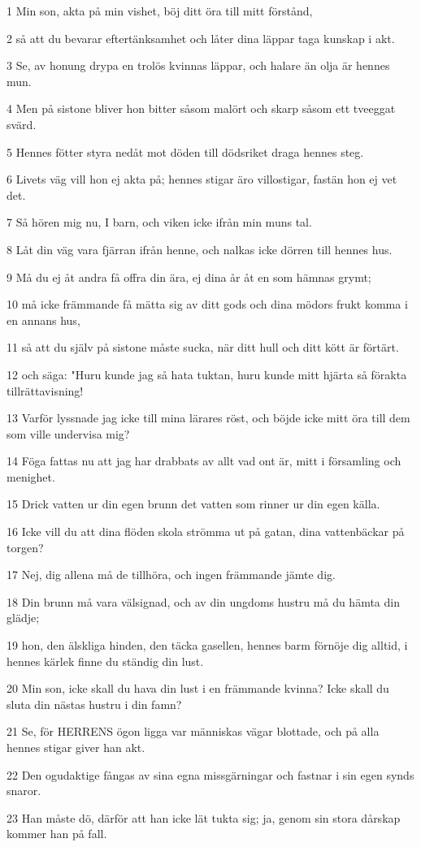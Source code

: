 \par 1 Min son, akta på min vishet, böj ditt öra till mitt förstånd,
\par 2 så att du bevarar eftertänksamhet och låter dina läppar taga kunskap i akt.
\par 3 Se, av honung drypa en trolös kvinnas läppar, och halare än olja är hennes mun.
\par 4 Men på sistone bliver hon bitter såsom malört och skarp såsom ett tveeggat svärd.
\par 5 Hennes fötter styra nedåt mot döden till dödsriket draga hennes steg.
\par 6 Livets väg vill hon ej akta på; hennes stigar äro villostigar, fastän hon ej vet det.
\par 7 Så hören mig nu, I barn, och viken icke ifrån min muns tal.
\par 8 Låt din väg vara fjärran ifrån henne, och nalkas icke dörren till hennes hus.
\par 9 Må du ej åt andra få offra din ära, ej dina år åt en som hämnas grymt;
\par 10 må icke främmande få mätta sig av ditt gods och dina mödors frukt komma i en annans hus,
\par 11 så att du själv på sistone måste sucka, när ditt hull och ditt kött är förtärt.
\par 12 och säga: "Huru kunde jag så hata tuktan, huru kunde mitt hjärta så förakta tillrättavisning!
\par 13 Varför lyssnade jag icke till mina lärares röst, och böjde icke mitt öra till dem som ville undervisa mig?
\par 14 Föga fattas nu att jag har drabbats av allt vad ont är, mitt i församling och menighet.
\par 15 Drick vatten ur din egen brunn det vatten som rinner ur din egen källa.
\par 16 Icke vill du att dina flöden skola strömma ut på gatan, dina vattenbäckar på torgen?
\par 17 Nej, dig allena må de tillhöra, och ingen främmande jämte dig.
\par 18 Din brunn må vara välsignad, och av din ungdoms hustru må du hämta din glädje;
\par 19 hon, den älskliga hinden, den täcka gasellen, hennes barm förnöje dig alltid, i hennes kärlek finne du ständig din lust.
\par 20 Min son, icke skall du hava din lust i en främmande kvinna? Icke skall du sluta din nästas hustru i din famn?
\par 21 Se, för HERRENS ögon ligga var människas vägar blottade, och på alla hennes stigar giver han akt.
\par 22 Den ogudaktige fångas av sina egna missgärningar och fastnar i sin egen synds snaror.
\par 23 Han måste dö, därför att han icke lät tukta sig; ja, genom sin stora dårskap kommer han på fall.

